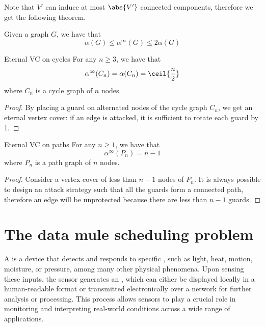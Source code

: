 \documentclass[a4paper, 12pt]{report}
\begin{document}
    Note that $V'$ can induce at most $\abs{V'}$ connected components, therefore we get the following theorem.

    \begin{framedthm}{}
        Given a graph $G$, we have that $$\alpha(G) \le \alpha^{\infty} (G) \le 2 \alpha(G)$$
    \end{framedthm}

    \begin{framedthm}{Eternal VC on cycles}
        For any $n \ge 3$, we have that $$\alpha^{\infty}(C_n) = \alpha(C_n) = \ceil{\frac{n}{2}}$$ where $C_n$ is a cycle graph of $n$ nodes.
    \end{framedthm}

    \begin{proof}
        By placing a guard on alternated nodes of the cycle graph $C_n$, we get an eternal vertex cover: if an edge is attacked, it is sufficient to rotate each guard by 1.
    \end{proof}

    \begin{framedthm}{Eternal VC on paths}
        For any $n \ge 1$, we have that $$\alpha^{\infty}(P_n) = n - 1$$ where $P_n$ is a path graph of $n$ nodes.
    \end{framedthm}
    
    \begin{proof}
        Consider a vertex cover of less than $n - 1$ nodes of $P_n$. It is always possible to design an attack strategy such that all the guards form a connected path, therefore an edge will be unprotected because there are less than $n - 1$ guards.
    \end{proof}

    \chapter{The data mule scheduling problem}

    A  is a device that detects and responds to specific , such as light, heat, motion, moisture, or pressure, among many other physical phenomena. Upon sensing these inputs, the sensor generates an , which can either be displayed locally in a human-readable format or transmitted electronically over a network for further analysis or processing. This process allows sensors to play a crucial role in monitoring and interpreting real-world conditions across a wide range of applications.
\end{document}
